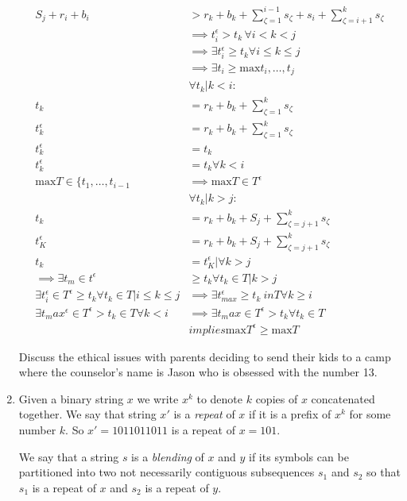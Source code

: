 \documentclass[11pt]{article}
\begin{document}
\begin{enumerate}[1.]
\begin{align*}
S_j+r_i+b_i&>r_k+b_k+\sum_{\zeta=1}^{i-1}s_\zeta+s_i+\sum_{\zeta=i+1}^ks_\zeta\\
&\implies t_i^\epsilon>t_k\,\forall i<k<j\\
&\implies \exists t_i^\epsilon\ge t_k \forall i\le k\le j\\
&\implies \exists t_i\ge\mathrm{max}{t_i,\ldots,t_j}\\
&\forall t_k | k<i:\\
t_k&=r_k+b_k+\sum_{\zeta=1}^ks_\zeta\\
t_k^\epsilon&=r_k+b_k+\sum_{\zeta=1}^ks_\zeta\\
t_k^\epsilon&=t_k\\
t_k^\epsilon&=t_k\forall k<i\\
\mathrm{max}T\in\{t_1,\ldots,t_{i-1}&\implies\mathrm{max}T\in T^\epsilon\\
&\forall t_k | k>j:\\
t_k &= r_k+b_k+S_j+\sum_{\zeta=j+1}^ks_\zeta\\
t_K^\epsilon&=r_k+b_k+S_j+\sum_{\zeta=j+1}^ks_\zeta\\
t_k&=t_K^\epsilon | \forall k>j\\
\implies \exists t_m \in t^\epsilon &\ge t_k\forall t_k\in T | k>j\\
\exists t_i^\epsilon\in T^\epsilon\ge t_k\forall t_k\in T|i\le k\le j&\implies \exists t_{max}^\epsilon \ge t_k \ in T \forall k\ge i\\
\exists t_max^\epsilon \in T^\epsilon > t_k \in T \forall k<i&\implies\exists t_max\in T^\epsilon>t_k\forall t_k \in T\\
&implies \mathrm{max}T^\epsilon\ge\mathrm{max}T
\end{align*}




Discuss the ethical issues with parents deciding to send their kids to a camp where the counselor's name is Jason who is obsessed with the number 13.   

\item Given a binary string $x$ we write $x^k$ to denote $k$ copies of $x$ concatenated together.  We say that string $x'$ is a \textit{repeat} of $x$ if it is a prefix of $x^k$ for some number $k$.  So $x' = 1011011011$ is a repeat of $x=101$.   

We say that a string $s$ is a \textit{blending} of $x$ and $y$ if its symbols can be partitioned into two not necessarily contiguous subsequences $s_1$ and $s_2$ so that $s_1$ is a repeat of $x$ and $s_2$ is a repeat of $y$.  


\end{enumerate}
\end{document}
